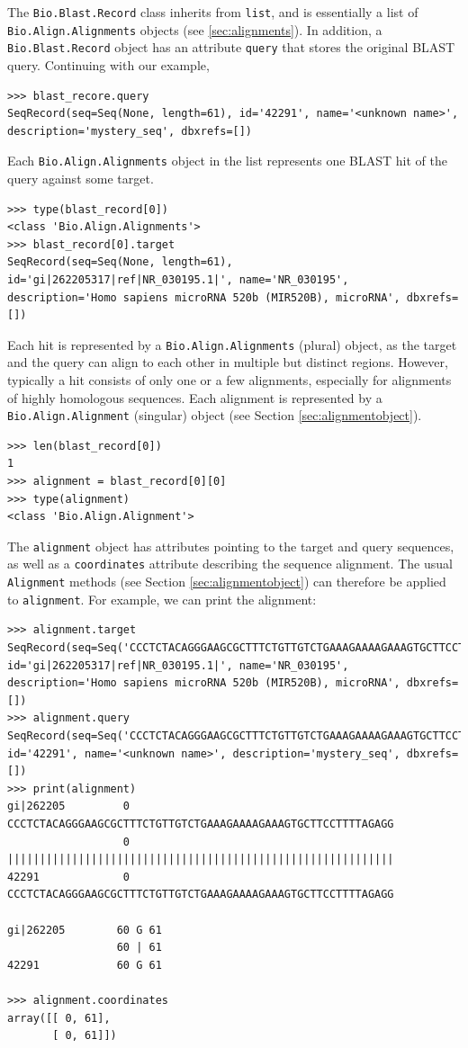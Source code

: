 The \verb|Bio.Blast.Record| class inherits from \verb+list+, and is essentially a list of \verb|Bio.Align.Alignments| objects (see \ref{sec:alignments}). In addition, a \verb|Bio.Blast.Record| object has an attribute \verb|query| that stores the original BLAST query. Continuing with our example,
\begin{verbatim}
>>> blast_recore.query
SeqRecord(seq=Seq(None, length=61), id='42291', name='<unknown name>', description='mystery_seq', dbxrefs=[])
\end{verbatim}
Each \verb|Bio.Align.Alignments| object in the list represents one BLAST hit of the query against some target.
\begin{verbatim}
>>> type(blast_record[0])
<class 'Bio.Align.Alignments'>
>>> blast_record[0].target
SeqRecord(seq=Seq(None, length=61), id='gi|262205317|ref|NR_030195.1|', name='NR_030195', description='Homo sapiens microRNA 520b (MIR520B), microRNA', dbxrefs=[])
\end{verbatim}
Each hit is represented by a \verb|Bio.Align.Alignments| (plural) object, as the target and the query can align to each other in multiple but distinct regions.
However, typically a hit consists of only one or a few alignments, especially for alignments of highly homologous sequences. Each alignment is represented by a  \verb|Bio.Align.Alignment| (singular) object (see Section \ref{sec:alignmentobject}).
\begin{verbatim}
>>> len(blast_record[0])
1
>>> alignment = blast_record[0][0]
>>> type(alignment)
<class 'Bio.Align.Alignment'>
\end{verbatim}
The \verb|alignment| object has attributes pointing to the target and query sequences, as well as a \verb|coordinates| attribute describing the sequence alignment. The usual \verb|Alignment| methods (see Section \ref{sec:alignmentobject}) can therefore be applied to \verb|alignment|. For example, we can print the alignment:
\begin{verbatim}
>>> alignment.target
SeqRecord(seq=Seq('CCCTCTACAGGGAAGCGCTTTCTGTTGTCTGAAAGAAAAGAAAGTGCTTCCTTT...GGG'), id='gi|262205317|ref|NR_030195.1|', name='NR_030195', description='Homo sapiens microRNA 520b (MIR520B), microRNA', dbxrefs=[])
>>> alignment.query
SeqRecord(seq=Seq('CCCTCTACAGGGAAGCGCTTTCTGTTGTCTGAAAGAAAAGAAAGTGCTTCCTTT...GGG'), id='42291', name='<unknown name>', description='mystery_seq', dbxrefs=[])
>>> print(alignment)
gi|262205         0 CCCTCTACAGGGAAGCGCTTTCTGTTGTCTGAAAGAAAAGAAAGTGCTTCCTTTTAGAGG
                  0 ||||||||||||||||||||||||||||||||||||||||||||||||||||||||||||
42291             0 CCCTCTACAGGGAAGCGCTTTCTGTTGTCTGAAAGAAAAGAAAGTGCTTCCTTTTAGAGG

gi|262205        60 G 61
                 60 | 61
42291            60 G 61

>>> alignment.coordinates
array([[ 0, 61],
       [ 0, 61]])
\end{verbatim}

